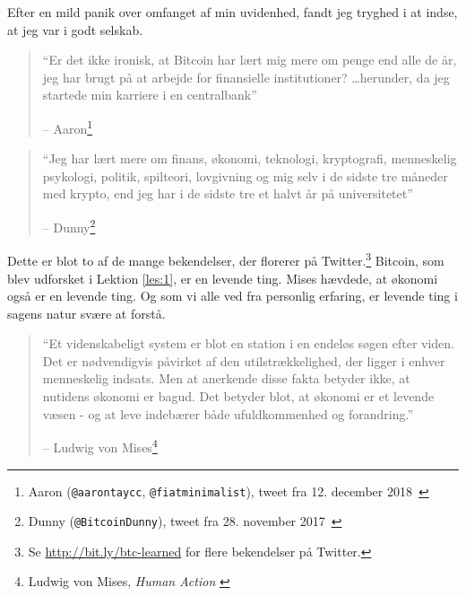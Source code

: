 \documentclass[paper=6in:9in,pagesize=pdftex,
               headinclude=on,footinclude=on,12pt]{scrbook}
\begin{document}
Efter en mild panik over omfanget af min uvidenhed, fandt jeg tryghed i at indse, at jeg var i godt selskab.\begin{quotation}\begin{samepage}
\enquote{Er det ikke ironisk, at Bitcoin har lært mig mere om penge end alle de år, jeg har brugt på at arbejde for finansielle institutioner? \ldots herunder, da jeg startede min karriere i en centralbank}
\begin{flushright} -- Aaron\footnote{Aaron (\texttt{@aarontaycc}, \texttt{@fiatminimalist}), tweet fra 12. december 2018~\cite{aarontaycc-tweet}}
\end{flushright}\end{samepage}\end{quotation}

\begin{quotation}\begin{samepage} \enquote{Jeg har lært mere om finans, økonomi, teknologi, kryptografi, menneskelig psykologi, politik, spilteori, lovgivning og mig selv i de sidste tre måneder med krypto, end jeg har i de sidste tre et halvt år på universitetet} \begin{flushright} -- Dunny\footnote{Dunny (\texttt{@BitcoinDunny}), tweet fra 28. november 2017~\cite{bitcoindunny-tweet}}
\end{flushright}\end{samepage}\end{quotation}

Dette er blot to af de mange bekendelser, der florerer på Twitter.\footnote{Se \url{http://bit.ly/btc-learned} for flere bekendelser på Twitter.} Bitcoin, som blev udforsket i Lektion  \ref{les:1}, er en levende ting. Mises hævdede, at økonomi også er en levende ting. Og som vi alle ved fra personlig erfaring, er levende ting i sagens natur svære at forstå.\begin{quotation}\begin{samepage} \enquote{Et videnskabeligt system er blot en station i en endeløs søgen efter viden. Det er nødvendigvis påvirket af den utilstrækkelighed, der ligger i enhver menneskelig indsats. Men at anerkende disse fakta betyder ikke, at nutidens økonomi er bagud. Det betyder blot, at økonomi er et levende væsen - og at leve indebærer både ufuldkommenhed og forandring.} \begin{flushright} -- Ludwig von Mises\footnote{Ludwig von Mises, \textit{Human Action} \cite{human-action}}
\end{flushright}\end{samepage}\end{quotation}
\end{document}

